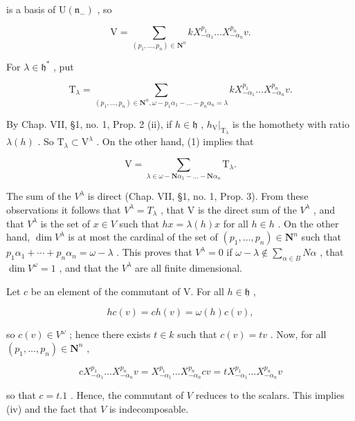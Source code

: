 is a basis of \(\mathrm{U}(\mathfrak{n}_{-})\) , so

\[
\mathrm{V} = \sum_ {(p _ {1}, \dots , p _ {n}) \in \mathbf {N} ^ {n}} k X _ {- \alpha_ {1}} ^ {p _ {1}} \dots X _ {- \alpha_ {n}} ^ {p _ {n}} v.\tag{1}
\]

For \(\lambda \in \mathfrak{h}^*\) , put

\[
\mathrm{T} _ {\lambda} = \sum_ {(p _ {1}, \ldots , p _ {n}) \in \mathbf {N} ^ {n}, \omega - p _ {1} \alpha_ {1} - \dots - p _ {n} \alpha_ {n} = \lambda} k X _ {- \alpha_ {1}} ^ {p _ {1}} \ldots X _ {- \alpha_ {n}} ^ {p _ {n}} v.
\]

By Chap. VII, §1, no. 1, Prop. 2 (ii), if \(h \in \mathfrak{h}\) , \(h_{\mathrm{V}}|_{\mathrm{T}_{\lambda}}\) is the homothety with ratio \(\lambda(h)\) . So \(\mathrm{T}_{\lambda} \subset \mathrm{V}^{\lambda}\) . On the other hand, (1) implies that

\[
\mathrm{V} = \sum_ {\lambda \in \omega - \mathbf {N} \alpha_ {1} - \dots - \mathbf {N} \alpha_ {n}} \mathrm{T} _ {\lambda}.
\]

The sum of the \(V^{\lambda}\) is direct (Chap. VII, §1, no. 1, Prop. 3). From these observations it follows that \(V^{\lambda} = T_{\lambda}\) , that V is the direct sum of the \(V^{\lambda}\) , and that \(V^{\lambda}\) is the set of \(x \in V\) such that \(hx = \lambda(h)x\) for all \(h \in h\) . On the other hand, \(\dim V^{\lambda}\) is at most the cardinal of the set of \((p_{1}, \ldots, p_{n}) \in \mathbf{N}^{n}\) such that \(p_{1}\alpha_{1} + \cdots + p_{n}\alpha_{n} = \omega - \lambda\) . This proves that \(V^{\lambda} = 0\) if \(\omega - \lambda \notin \sum_{\alpha \in B} N\alpha\) , that \(\dim V^{\omega} = 1\) , and that the \(V^{\lambda}\) are all finite dimensional.

Let \(c\) be an element of the commutant of V. For all \(h \in \mathfrak{h}\) ,

\[
h c (v) = c h (v) = \omega (h) c (v),
\]

so \(c(v) \in V^{\omega}\) ; hence there exists \(t \in k\) such that \(c(v) = tv\) . Now, for all \((p_1, \ldots, p_n) \in \mathbf{N}^n\) ,

\[
c X _ {- \alpha_ {1}} ^ {p _ {1}} \dots X _ {- \alpha_ {n}} ^ {p _ {n}} v = X _ {- \alpha_ {1}} ^ {p _ {1}} \dots X _ {- \alpha_ {n}} ^ {p _ {n}} c v = t X _ {- \alpha_ {1}} ^ {p _ {1}} \dots X _ {- \alpha_ {n}} ^ {p _ {n}} v
\]

so that \(c = t.1\) . Hence, the commutant of \(V\) reduces to the scalars. This implies (iv) and the fact that \(V\) is indecomposable.

